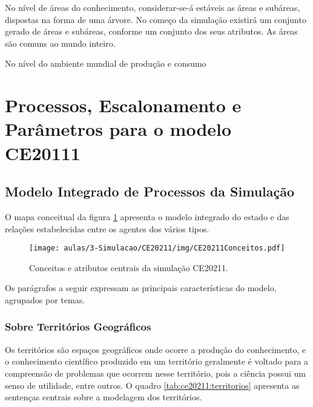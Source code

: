 No nível de áreas do conhecimento, considerar-se-á estáveis as áreas e subáreas, dispostas na forma de uma árvore. 
No começo da simulação existirá um conjunto gerado de áreas e subáreas, conforme um conjunto dos seus atributos. As áreas são comuns ao mundo inteiro.

No nível do ambiente mundial de produção e consumo 

\section{Processos, Escalonamento e Parâmetros para o modelo CE20111}

\subsection{Modelo Integrado de Processos da Simulação}

O mapa conceitual da figura \ref{fig:CE20211:ConceitosCentrais} apresenta o modelo integrado do estado e das relações estabelecidas entre os agentes dos vários tipos.

\begin{figure}
    \centering
    \texttt{[image: aulas/3-Simulacao/CE20211/img/CE20211Conceitos.pdf]}
    \caption{Conceitos e atributos centrais da simulação CE20211.}
    \label{fig:CE20211:ConceitosCentrais}
\end{figure}

Os parágrafos a seguir expressam as principais características do modelo, agrupados por temas.

\subsubsection{Sobre Territórios Geográficos} Os territórios são espaços geográficos onde ocorre a produção do conhecimento, e o conhecimento científico produzido em um território geralmente é voltado para a compreensão de problemas que ocorrem nesse território, pois a ciência possui um senso de utilidade, entre outros.
O quadro \ref{tab:ce20211:territorios} apresenta as sentenças centrais sobre a modelagem dos territórios.

